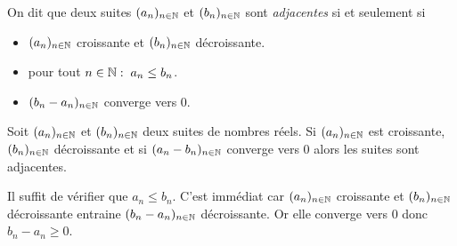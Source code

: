 \begin{defi}
  On dit que deux suites $(a_n)_{n\in\mathbb{N}}$ et $(b_n)_{n\in\mathbb{N}}$ sont \emph{adjacentes} si et seulement si
\begin{itemize}
  \item $(a_n)_{n\in\mathbb{N}}$ croissante et $(b_n)_{n\in\mathbb{N}}$ décroissante.
  \item pour tout $n\in \mathbb{N}:\; a_n \leq b_n$.
  \item $(b_n - a_n)_{n\in\mathbb{N}}$ converge vers $0$.
\end{itemize}
\end{defi}
\begin{prop}
  Soit $(a_n)_{n\in\mathbb{N}}$ et $(b_n)_{n\in\mathbb{N}}$ deux suites de nombres réels. Si $(a_n)_{n\in\mathbb{N}}$ est croissante, $(b_n)_{n\in\mathbb{N}}$ décroissante et si $(a_n -b_n)_{n\in\mathbb{N}}$ converge vers $0$ alors les suites sont adjacentes. 
\end{prop}
\begin{demo}
  Il suffit de vérifier que $a_n \leq b_n$. C'est immédiat car $(a_n)_{n\in\mathbb{N}}$ croissante et $(b_n)_{n\in\mathbb{N}}$ décroissante entraine $(b_n - a_n)_{n\in\mathbb{N}}$ décroissante. Or elle converge vers $0$ donc $b_n - a_n \geq 0$.
\end{demo}


